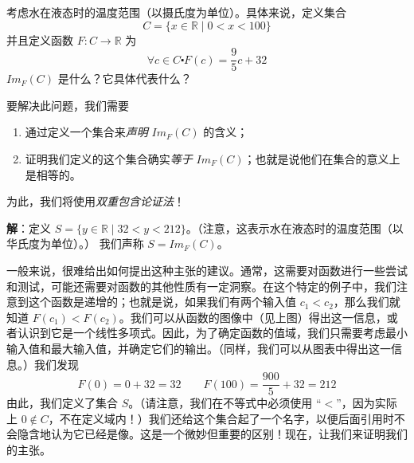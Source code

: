 \begin{example}
    考虑水在液态时的温度范围（以摄氏度为单位）。具体来说，定义集合
    \[C = \{x \in \mathbb{R} \mid 0 < x < 100\}\]
    并且定义函数 $F : C \to \mathbb{R}$ 为
    \[\forall c \in C \centerdot F(c) = \frac{9}{5}c + 32\]
    $Im_F (C)$ 是什么？它具体代表什么？

    要解决此问题，我们需要
    \begin{enumerate}[label=(\alph*)]
        \item 通过定义一个集合来\emph{声明} $Im_F (C)$ 的含义；
        \item 证明我们定义的这个集合确实\emph{等于} $Im_F (C)$；也就是说他们在集合的意义上是相等的。 
    \end{enumerate}
    为此，我们将使用\emph{双重包含论证法}！

    \textbf{解}：定义 $S = \{y \in \mathbb{R} \mid 32 < y < 212\}$。（注意，这表示水在液态时的温度范围（以华氏度为单位）。） 我们声称 $S = Im_F (C)$。

    \begin{center}
    \end{center}

    一般来说，很难给出如何提出这种主张的建议。通常，这需要对函数进行一些尝试和测试，可能还需要对函数的其他性质有一定洞察。在这个特定的例子中，我们注意到这个函数是递增的；也就是说，如果我们有两个输入值 $c_1 < c_2$，那么我们就知道 $F(c_1) < F(c_2)$。我们可以从函数的图像中（见上图）得出这一信息，或者认识到它是一个线性多项式。因此，为了确定函数的值域，我们只需要考虑最小输入值和最大输入值，并确定它们的输出。（同样，我们可以从图表中得出这一信息。）我们发现
    \[F(0) = 0 + 32 = 32 \qquad F(100) = \frac{900}{5} + 32 = 212\]
    由此，我们定义了集合 $S$。（请注意，我们在不等式中必须使用 ``$<$''，因为实际上 $0 \notin C$，不在定义域内！）我们还给这个集合起了一个名字，以便后面引用时不会隐含地认为它已经是像。这是一个微妙但重要的区别！现在，让我们来证明我们的主张。


\end{example}
